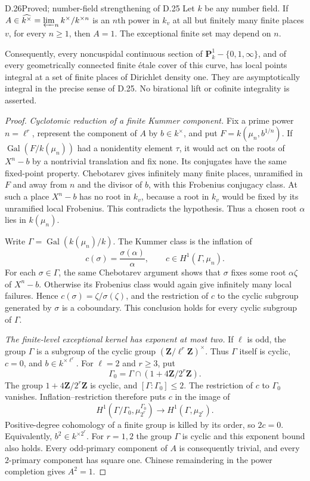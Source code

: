 
\begin{claim}{D.26}{Proved; number-field strengthening of D.25}\label{clm:D26}
Let $k$ be any number field. If
$A\in\widehat{k^\times}=\varprojlim_n k^\times/k^{\times n}$
is an $n$th power in $k_v$ at all but finitely many finite
places $v$, for every $n\ge1$, then $A=1$.
The exceptional finite set may depend on $n$.

Consequently, every noncuspidal continuous section of
$\mathbf P^1_k-\{0,1,\infty\}$, and of every geometrically
connected finite \'etale cover of this curve, has local points
integral at a set of finite places of Dirichlet density one.
They are asymptotically integral in the precise sense of D.25.
No birational lift or cofinite integrality is asserted.
\end{claim}
\begin{proof}
\emph{Cyclotomic reduction of a finite Kummer component.}
Fix a prime power $n=\ell^r$, represent the component of $A$
by $b\in k^\times$, and put
$F=k(\mu_n,b^{1/n})$.
If $\operatorname{Gal}(F/k(\mu_n))$ had a nonidentity element
$\tau$, it would act on the roots of $X^n-b$ by a nontrivial
translation and fix none. Its conjugates have the same
fixed-point property. Chebotarev gives infinitely many finite
places, unramified in $F$ and away from $n$ and the divisor of
$b$, with this Frobenius conjugacy class. At such a place
$X^n-b$ has no root in $k_v$, because a root in $k_v$ would
be fixed by its unramified local Frobenius. This contradicts
the hypothesis. Thus a chosen root $\alpha$ lies in $k(\mu_n)$.

Write $\Gamma=\operatorname{Gal}(k(\mu_n)/k)$. The Kummer
class is the inflation of
\[
 c(\sigma)=\frac{\sigma(\alpha)}{\alpha},\qquad
 c\in H^1(\Gamma,\mu_n).
 \tag{D.26.1}
\]
For each $\sigma\in\Gamma$, the same Chebotarev argument
shows that $\sigma$ fixes some root $\alpha\zeta$ of
$X^n-b$. Otherwise its Frobenius class would again give
infinitely many local failures. Hence
$c(\sigma)=\zeta/\sigma(\zeta)$, and the restriction of $c$
to the cyclic subgroup generated by $\sigma$ is a coboundary.
This conclusion holds for every cyclic subgroup of $\Gamma$.

\emph{The finite-level exceptional kernel has exponent at most two.}
If $\ell$ is odd, the group $\Gamma$ is a subgroup of the
cyclic group $(\mathbf Z/\ell^r\mathbf Z)^\times$.
Thus $\Gamma$ itself is cyclic, $c=0$, and
$b\in k^{\times\ell^r}$.
For $\ell=2$ and $r\ge3$, put
\[
 \Gamma_0=\Gamma\cap
       (1+4\mathbf Z/2^r\mathbf Z).
\]
The group $1+4\mathbf Z/2^r\mathbf Z$ is cyclic, and
$[\Gamma:\Gamma_0]\le2$. The restriction of $c$ to
$\Gamma_0$ vanishes. Inflation--restriction therefore puts
$c$ in the image of
\[
 H^1(\Gamma/\Gamma_0,\mu_{2^r}^{\Gamma_0})
       \longrightarrow H^1(\Gamma,\mu_{2^r}).
\]
Positive-degree cohomology of a finite group is killed by
its order, so $2c=0$. Equivalently,
$b^2\in k^{\times 2^r}$. For $r=1,2$ the group $\Gamma$
is cyclic and this exponent bound also holds.
Every odd-primary component of $A$ is consequently trivial,
and every $2$-primary component has square one. Chinese
remaindering in the power completion gives $A^2=1$.


\end{proof}
